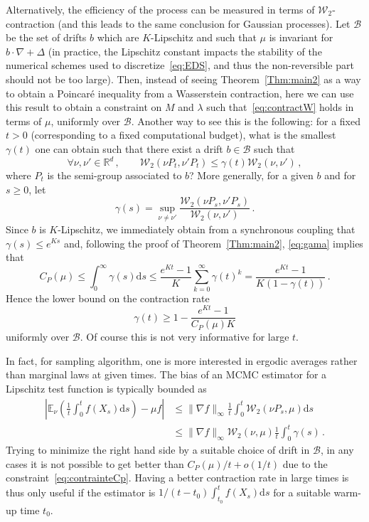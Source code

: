 \documentclass[AHL,Unicode,longabstracts,published]{cedram}
\newcommand{\R}{\mathbb R}
\newcommand{\bbE}{\mathbb E}
\newcommand{\clW}{\mathcal W}
\newcommand{\clB}{\mathcal B}
\newcommand{\dd}{\mathrm{d}}
\newcommand{\na}{\nabla}
\newcommand{\1}{\mathbbm{1}}
\newcommand{\nv}[1]{#1}
\let\oldforall\forall
\renewcommand*{\forall}{\mathrel{\oldforall}}
\newcommand{\R}{\mathbb R}
\newcommand{\clW}{\mathcal W}
\begin{document}
Alternatively, the efficiency of the process can be measured in term\nv{s} of $\clW_2$-contraction (and this leads to the same conclusion for Gaussian processes). Let $\clB$ be the set of drifts $b$ which are $K$-Lipschitz and such that $\mu$ is invariant for $b\cdot \na +\Delta$ (in practice, the Lipschitz constant impacts the stability of the numerical schemes used to discretize~\eqref{eq:EDS}, and thus the non-reversible part should not be too large). Then, instead of seeing Theorem~\ref{Thm:main2} as a way to obtain a Poincaré inequality from a Wasserstein contraction, here we can use this result to obtain a constraint on $M$ and $\lambda$ such that~\eqref{eq:contractW} holds in term\nv{s} of $\mu$, uniformly over $\clB$. Another way to see this is the following: for a fixed $t>0$ (corresponding to a fixed computational budget), what is the smallest $\gamma(t)$ one can obtain such that there exist a drift $b\in\clB$ such that
\begin{equation}\label{eq:gama}
\forall \nu,\nu'\in\R^d\,,\qquad \clW_2(\nu P_t,\nu' P_t) \leqslant \gamma(t) \clW_2(\nu,\nu')\,,
\end{equation}
where $P_t$ is the semi-group associated to $b$? More generally, for a given $b$ and for $s\geqslant 0$, let
\[
\gamma(s) = \sup_{\nu\neq \nu'} \frac{\clW_2(\nu P_s,\nu' P_s)}{\clW_2(\nu,\nu')}\,.
\]
Since $b$ is $K$-Lipschitz, we immediately obtain from a synchronous coupling that $\gamma(s)\leqslant e^{Ks}$ and, following the proof of Theorem~\ref{Thm:main2}, \eqref{eq:gama} implies that
\begin{equation}\label{eq:contrainteCp}
C_P(\mu) \leqslant \int_0^\infty \gamma(s)\dd s \leqslant \frac{e^{Kt}-1}{K}\sum_{k=0}^\infty \gamma(t)^k = \frac{e^{Kt}-1}{K(1-\gamma(t))} \,.
\end{equation}
Hence the lower bound on the contraction rate
\[
\gamma(t) \geqslant 1 - \frac{e^{Kt}-1}{C_P(\mu)K}
\]
uniformly over $\clB$. Of course this is not very informative for large $t$.

In fact, for sampling algorithm, one is more interested in ergodic averages rather than marginal laws at given times. The bias of an MCMC estimator for a Lipschitz test function is typically bounded as
\begin{align*}
\left|\bbE_\nu\left( \frac{1}{t}\int_0^t f(X_s) \dd s\right) - \mu f \right| &\leqslant \|\na f\|_\infty \frac1t\int_0^t \clW_2(\nu P_s,\mu) \dd s\\ &\leqslant \|\na f\|_\infty \clW_2(\nu,\mu) \frac1t \int_0^t \gamma(s)\,.
\end{align*}
Trying to minimize the right hand side by a suitable choice of drift in $\clB$, in any cases it is not possible to get better than $C_P(\mu)/t + o(1/t)$ due to the constraint~\eqref{eq:contrainteCp}. Having a better contraction rate in large times is thus only useful if the estimator is $1/(t-t_0)\int_{t_0}^t f(X_s)\dd s$ for a suitable warm-up time $t_0$.
\end{document}
